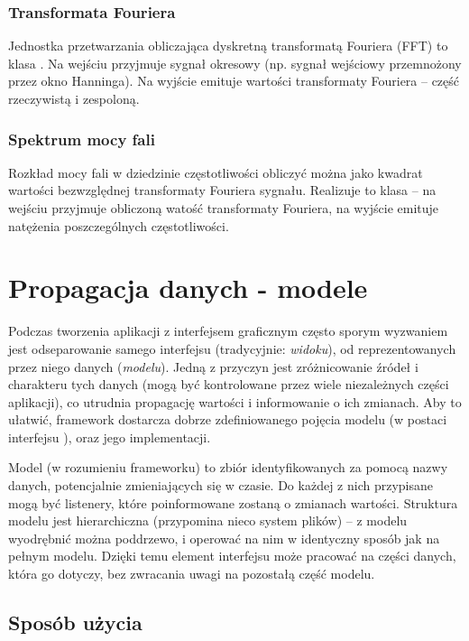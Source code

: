 \subsubsection{Transformata Fouriera}

Jednostka przetwarzania obliczająca dyskretną transformatą Fouriera (FFT) to klasa . Na
wejściu przyjmuje sygnał okresowy (np. sygnał wejściowy przemnożony przez okno Hanninga). Na wyjście
emituje wartości transformaty Fouriera -- część rzeczywistą i zespoloną.

\subsubsection{Spektrum mocy fali}

Rozkład mocy fali w dziedzinie częstotliwości obliczyć można jako kwadrat wartości bezwzględnej
transformaty Fouriera sygnału. Realizuje to klasa  -- na wejściu przyjmuje
obliczoną watość transformaty Fouriera, na wyjście emituje natężenia poszczególnych częstotliwości.


\section{Propagacja danych - modele}

Podczas tworzenia aplikacji z interfejsem graficznym często sporym wyzwaniem jest odseparowanie
samego interfejsu (tradycyjnie: \emph{widoku}), od reprezentowanych przez niego danych
(\emph{modelu}). Jedną z przyczyn jest zróżnicowanie źródeł i charakteru tych danych (mogą być
kontrolowane przez wiele niezależnych części aplikacji), co utrudnia propagację wartości i
informowanie o ich zmianach. Aby to ułatwić, framework dostarcza dobrze zdefiniowanego pojęcia
modelu (w postaci interfejsu ), oraz jego implementacji.

Model (w rozumieniu frameworku) to zbiór identyfikowanych za pomocą nazwy danych, potencjalnie
zmieniających się w czasie. Do każdej z nich przypisane mogą być listenery, które poinformowane
zostaną o zmianach wartości. Struktura modelu jest hierarchiczna (przypomina nieco system plików) --
z modelu wyodrębnić można poddrzewo, i operować na nim w identyczny sposób jak na pełnym modelu.
Dzięki temu element interfejsu może pracować na części danych, która go dotyczy, bez zwracania uwagi
na pozostałą część modelu.

\subsection{Sposób użycia}

